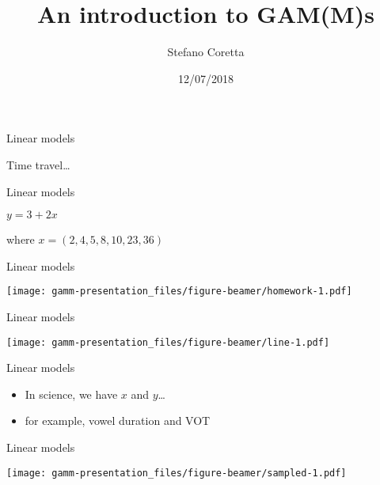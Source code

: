 \documentclass[ignorenonframetext,]{beamer}
\title{An introduction to GAM(M)s}
\author{Stefano Coretta}
\date{12/07/2018}
\begin{document}
\frame{\titlepage}

\begin{frame}{Linear models}
\protect\hypertarget{linear-models}{}

\centering \Huge

Time travel\ldots{}

\end{frame}

\begin{frame}{Linear models}
\protect\hypertarget{linear-models-1}{}

\centering \Huge

\(y = 3 + 2x\)

\large

where \(x = (2, 4, 5, 8, 10, 23, 36)\)

\end{frame}

\begin{frame}{Linear models}
\protect\hypertarget{linear-models-2}{}

\texttt{[image: gamm-presentation\_files/figure-beamer/homework-1.pdf]}

\end{frame}

\begin{frame}{Linear models}
\protect\hypertarget{linear-models-3}{}

\texttt{[image: gamm-presentation\_files/figure-beamer/line-1.pdf]}

\end{frame}

\begin{frame}{Linear models}
\protect\hypertarget{linear-models-4}{}

\begin{itemize}
\item
  In science, we have \(x\) and \(y\)\ldots{}
\item
  for example, vowel duration and VOT
\end{itemize}

\end{frame}

\begin{frame}{Linear models}
\protect\hypertarget{linear-models-5}{}

\texttt{[image: gamm-presentation\_files/figure-beamer/sampled-1.pdf]}

\end{frame}
\end{document}
